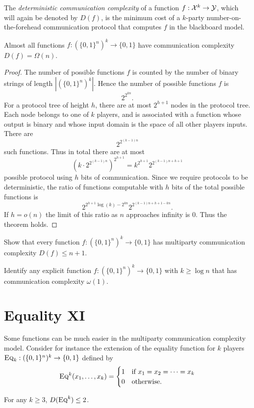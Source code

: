 The \emph{deterministic communication complexity} of a function $f : \mathcal{X}^k \to \mathcal{Y}$, which will again be denoted by $D(f)$, is the minimum cost of a $k$-party number-on-the-forehead communication protocol that computes $f$ in the blackboard model.

\begin{theorem}
Almost all functions $f : (\{0,1\}^{n})^k \to \{0,1\}$ have communication complexity $D(f) = \Omega(n)$.
\end{theorem}

\begin{proof}
The number of possible functions $f$ is counted by the number of binary strings of length $|(\{0,1\}^n)^k|$. Hence the number of possible functions $f$ is 
$$2^{2^{kn}}.$$
For a protocol tree of height $h$, there are at most $2^{h+1}$ nodes in the protocol tree. Each node belongs to one of $k$ players, and is associated with a function whose output is binary and whose input domain is the space of all other players inputs. There are 
$$2^{2^{(k-1)n}}$$ 
such functions. Thus in total there are at most
$$(k\cdot 2^{2^{(k-1)n}})^{2^{h+1}} = k^{2^{h+1}}2^{2^{(k-1)n + h + 1}}$$
possible protocol using $h$ bits of communication. Since we require protocols to be deterministic, the ratio of functions computable with $h$ bits of the total possible functions is 
$$ 2^{2^{h+1}\log(k) - 2^{kn}}2^{2^{(k-1)n +h + 1 -kn}}.$$
If $h = o(n)$ the limit of this ratio as $n$ approaches infinity is $0$. Thus the theorem holds.
\end{proof}

\exercises

\begin{exercise}
Show that every function $f : (\{0,1\}^{n})^k \to \{0,1\}$ has multiparty communication complexity $D(f) \le n+1$.
\end{exercise}

\begin{open}
Identify any explicit function $f : (\{0,1\}^{n})^k \to \{0,1\}$ with $k \ge \log n$ that has communication complexity $\omega(1)$.
\end{open}


\newpage 
\section{Equality XI}

Some functions can be much easier in the multiparty communication complexity model. Consider for instance the extension of the equality function for $k$ players $\textsc{Eq}_k : (\{0,1\}^n)^k \to \{0,1\}$ defined by
\[
\textsc{Eq}^k(x_1,\ldots,x_k) = \begin{cases}
1 & \mbox{if } x_1 = x_2 = \cdots = x_k \\
0 & \mbox{otherwise.}
\end{cases}
\]
\begin{theorem}
For any $k \ge 3$, $D(\textsc{Eq}^k) \le 2$.
\end{theorem}

